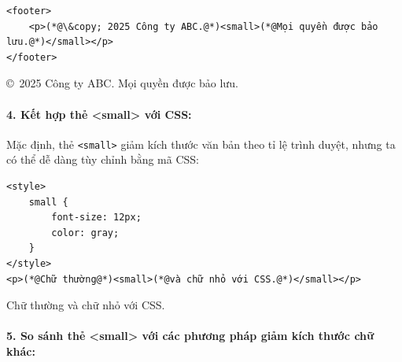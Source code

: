 \documentclass[11pt,oneside]{book}
\newcommand{\codeinline}[1]{\textcolor{accentOrange}{\texttt{#1}}}
\begin{document}
\begin{codeWindow}
\begin{lstlisting}[language=HTML5]
<footer>
    <p>(*@\&copy; 2025 Công ty ABC.@*)<small>(*@Mọi quyền được bảo lưu.@*)</small></p>
</footer>
\end{lstlisting}
\end{codeWindow}

\begin{tcolorbox}[
    enhanced,
    colback=white,
    colframe=primaryBlue!20,
    arc=6pt,
    boxrule=0.8pt,
    drop shadow=black!3!white,
    top=8pt, bottom=8pt, left=12pt, right=12pt,
    title={\sffamily\bfseries\scriptsize\color{codeComment} KẾT QUẢ HIỂN THỊ TRÊN TRÌNH DUYỆT (BROWSER PREVIEW)},
    coltitle=codeComment,
    colbacktitle=codeBg!80!white
]
\copyright\ 2025 Công ty ABC. {\small Mọi quyền được bảo lưu.}
\end{tcolorbox}


\paragraph{4. Kết hợp thẻ <small> với CSS:}
Mặc định, thẻ \codeinline{<small>} giảm kích thước văn bản theo tỉ lệ trình duyệt, nhưng ta có thể dễ dàng tùy chỉnh bằng mã CSS:

\begin{codeWindow}
\begin{lstlisting}[language=HTML5]
<style>
    small {
        font-size: 12px;
        color: gray;
    }
</style>
<p>(*@Chữ thường@*)<small>(*@và chữ nhỏ với CSS.@*)</small></p>
\end{lstlisting}
\end{codeWindow}

\begin{tcolorbox}[
    enhanced,
    colback=white,
    colframe=primaryBlue!20,
    arc=6pt,
    boxrule=0.8pt,
    drop shadow=black!3!white,
    top=8pt, bottom=8pt, left=12pt, right=12pt,
    title={\sffamily\bfseries\scriptsize\color{codeComment} KẾT QUẢ HIỂN THỊ TRÊN TRÌNH DUYỆT (BROWSER PREVIEW)},
    coltitle=codeComment,
    colbacktitle=codeBg!80!white
]
Chữ thường {\fontsize{8.5pt}{10pt}\selectfont\color{darkText!60} và chữ nhỏ với CSS.}
\end{tcolorbox}


\paragraph{5. So sánh thẻ <small> với các phương pháp giảm kích thước chữ khác:}
\end{document}
